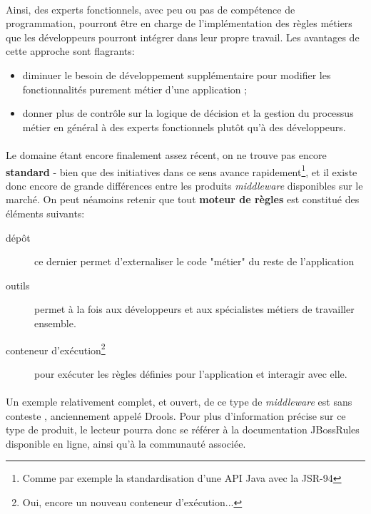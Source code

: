{  \paragraph{} Ainsi, des experts fonctionnels, avec peu ou pas de compétence de programmation,
  pourront être en charge de l'implémentation des règles métiers que les développeurs pourront
  intégrer dans leur propre travail. Les avantages de cette approche sont
  flagrants:

  \begin{itemize}
    \item diminuer le besoin de développement supplémentaire pour modifier les fonctionnalités
    purement métier d'une application ;
    \item donner plus de contrôle sur la logique de décision et la gestion du processus métier en
    général à des experts fonctionnels plutôt qu'à des développeurs.
  \end{itemize}

  \paragraph{} Le domaine étant encore finalement assez récent, on ne trouve pas encore
  \textbf{standard} - bien que des initiatives dans ce sens avance rapidement\footnote{Comme par
  exemple la standardisation d'une API Java avec la JSR-94}, et il existe donc
  encore de grande différences entre les produits \textit{middleware} disponibles sur le marché. On
  peut néamoins retenir que tout \textbf{moteur de règles} est constitué des éléments suivants:

  \begin{description}
      \item[dépôt] ce dernier permet d'externaliser le code "métier" du reste de
      l'application
      \item[outils] permet à la fois aux développeurs et aux spécialistes métiers de travailler
      ensemble.
      \item[conteneur d'exécution\footnote{Oui, encore un nouveau conteneur d'exécution...}] pour
      exécuter les règles définies pour l'application et interagir avec elle.
  \end{description}

  \paragraph{} Un exemple relativement complet, et ouvert, de ce type de \textit{middleware} est sans
  conteste , anciennement appelé
  Drools. Pour plus d'information précise sur ce type de produit, le lecteur pourra donc se référer
  à la documentation JBossRules disponible en ligne, ainsi qu'à la communauté associée.
}

